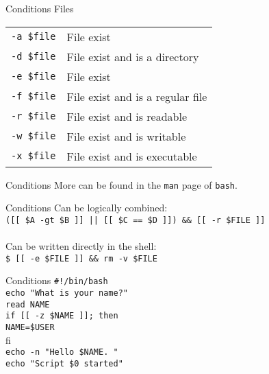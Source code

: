 \documentclass{beamer}
\let\tt\texttt
\begin{document}
\begin{frame}{Conditions}
        Files      \\
        \begin{tabular}{l l}
                \tt{-a \$file}    &   File exist                    \\
                \tt{-d \$file}    &   File exist and is a directory \\
                \tt{-e \$file}    &   File exist                    \\
                \tt{-f \$file}    &   File exist and is a regular file  \\
                \tt{-r \$file}    &   File exist and is readable    \\
                \tt{-w \$file}    &   File exist and is writable    \\
                \tt{-x \$file}    &   File exist and is executable  \\
        \end{tabular}
\end{frame}

\begin{frame}{Conditions}
        More can be found in the \tt{man} page of \tt{bash}.
\end{frame}

\begin{frame}{Conditions}
        Can be logically combined: \\
        \tt{([[ \$A -gt \$B ]] || [[ \$C == \$D ]]) \&\& [[ -r \$FILE ]] } \\
        \quad \\
        Can be written directly in the shell:   \\
        \tt{\$ [[ -e \$FILE ]] \&\& rm -v \$FILE} \\
\end{frame}

\begin{frame}{Conditions}
        \tt{\#!/bin/bash}                   \\
        \tt{echo "What is your name?"}      \\
        \tt{read NAME}                      \\
        \tt{if [[ -z \$NAME ]]; then}       \\
        \quad \tt{NAME=\$USER}              \\
        fi                                  \\
        \tt{echo -n "Hello \$NAME. "}       \\
        \tt{echo "Script \$0 started"}      \\
\end{frame}
\end{document}

